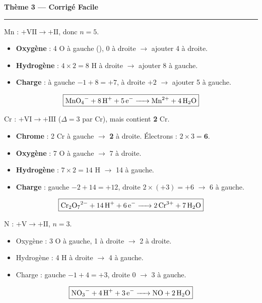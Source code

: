 \documentclass[11pt,a4paper]{article}
\begin{document}
\begin{center}
{\LARGE\bfseries\color{primarydark}Thème 3 — Corrigé Facile}\\[-2pt]
{\color{corrcol}\rule{\textwidth}{1pt}}
\end{center}

\begin{corr}
Mn : $+\mathrm{VII}\to+\mathrm{II}$, donc $n=5$.
\begin{itemize}[leftmargin=1.5em,topsep=1pt,itemsep=1pt]
  \item \textbf{Oxygène} : 4 O à gauche (), 0 à droite $\to$ ajouter 4  à droite.
  \item \textbf{Hydrogène} : $4\times2=8$ H à droite $\to$ ajouter 8  à gauche.
  \item \textbf{Charge} : à gauche $-1+8=+7$, à droite $+2$ $\to$ ajouter 5  à gauche.
\end{itemize}
\[
\boxed{\ce{MnO4^- + 8 H+ + 5 e^- -> Mn^{2+} + 4 H2O}}
\]
\end{corr}

\begin{corr}
Cr : $+\mathrm{VI}\to+\mathrm{III}$ ($\Delta=3$ par Cr), mais  contient \textbf{2} Cr.
\begin{itemize}[leftmargin=1.5em,topsep=1pt,itemsep=1pt]
  \item \textbf{Chrome} : 2 Cr à gauche $\to$ \textbf{2}  à droite. Électrons : $2\times3=\mathbf{6}$.
  \item \textbf{Oxygène} : 7 O à gauche $\to$ 7  à droite.
  \item \textbf{Hydrogène} : $7\times2=14$ H $\to$ 14  à gauche.
  \item \textbf{Charge} : gauche $-2+14=+12$, droite $2\times(+3)=+6$ $\to$ 6  à gauche. \checkmark
\end{itemize}
\[
\boxed{\ce{Cr2O7^{2-} + 14 H+ + 6 e^- -> 2 Cr^{3+} + 7 H2O}}
\]
\end{corr}

\begin{corr}
N : $+\mathrm{V}\to+\mathrm{II}$, $n=3$.
\begin{itemize}[leftmargin=1.5em,topsep=1pt,itemsep=1pt]
  \item Oxygène : 3 O à gauche, 1 à droite $\to$ 2  à droite.
  \item Hydrogène : 4 H à droite $\to$ 4  à gauche.
  \item Charge : gauche $-1+4=+3$, droite $0$ $\to$ 3  à gauche.
\end{itemize}
\[
\boxed{\ce{NO3^- + 4 H+ + 3 e^- -> NO + 2 H2O}}
\]
\end{corr}
\end{document}
